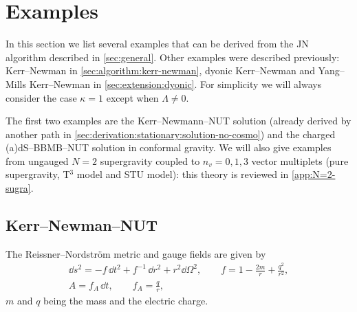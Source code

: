 \section{Examples}
\label{sec:examples}


In this section we list several examples that can be derived from the JN algorithm described in \cref{sec:general}.
Other examples were described previously: Kerr--Newman in \cref{sec:algorithm:kerr-newman}, dyonic Kerr--Newman and Yang--Mills Kerr--Newman in \cref{sec:extension:dyonic}.
For simplicity we will always consider the case $\kappa = 1$ except when $\Lambda \neq 0$.

The first two examples are the Kerr--Newmann--NUT solution (already derived by another path in \cref{sec:derivation:stationary:solution-no-cosmo}) and the charged (a)dS--BBMB--NUT solution in conformal gravity.
We will also give examples from ungauged $N = 2$ supergravity coupled to $n_v = 0, 1, 3$ vector multiplets (pure supergravity, T$^3$ model and STU model): this theory is reviewed in \cref{app:N=2-sugra}.



\subsection{Kerr--Newman--NUT}


The Reissner--Nordström metric and gauge fields are given by
\begin{subequations}
\label{matter:eq:reissner-nordstrom}
\begin{gather}
	\label{matter:metric:reissner-nordstrom:tr}
	\dd s^2 = - f\, \dd t^2 + f^{-1}\, \dd r^2 + r^2 \dd \Omega^2, \qquad
	f = 1 - \frac{2m}{r} + \frac{q^2}{r^2}, \\
	A = f_A\, \dd t, \qquad
	f_A = \frac{q}{r},
\end{gather} 
\end{subequations}
$m$ and $q$ being the mass and the electric charge.

